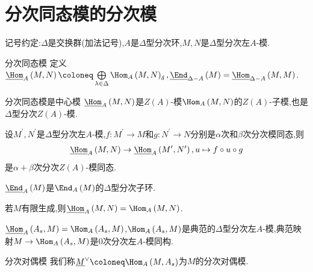 \section{分次同态模的分次模}

记号约定:$\Delta$是交换群(加法记号),$A$是$\Delta$型分次环,$M,N$是$\Delta$型分次左$A$-模.

\begin{definition}{分次同态模}{}
	定义$\underline{\Hom}_{A}\left(M,N\right)\coloneq\bigoplus\limits_{\lambda\in\Delta}\Hom_{A}\left(M,N\right)_{\delta},\underline{\End}_{\Delta-A}\left(M\right)=\underline{\Hom}_{\Delta-A}\left(M,M\right)$.
\end{definition}

\begin{proposition}{分次同态模是中心模}{}
	$\underline{\Hom}_{A}\left(M,N\right)$是$Z\left(A\right)$-模$\Hom_{A}\left(M,N\right)$的$Z\left(A\right)$-子模,也是$\Delta$型分次$Z\left(A\right)$-模.
\end{proposition}

\begin{proposition}{}{}
	设$M^{\prime},N^{\prime}$是$\Delta$型分次左$A$-模,$f:M^{\prime}\to M$和$g:N^{\prime}\to N$分别是$\alpha$次和$\beta$次分次模同态,则
	\begin{align*}
		\underline{\Hom}_{A}\left(M,N\right)\to\underline{\Hom}_{A}\left(M^{\prime},N^{\prime}\right),u\mapsto f\circ u\circ g
	\end{align*}
	是$\alpha+\beta$次分次$Z\left(A\right)$-模同态.
\end{proposition}

\begin{corollary}{}{}
	$\underline{\End}_{A}\left(M\right)$是$\End_{A}\left(M\right)$的$\Delta$型分次子环.
\end{corollary}

\begin{proposition}{}{}
	若$M$有限生成,则$\underline{\Hom}_{A}\left(M,N\right)=\Hom_{A}\left(M,N\right)$.
\end{proposition}

\begin{corollary}{}{}
	$\underline{\Hom}_{A}\left(A_{s},M\right)=\Hom_{A}\left(A_{s},M\right)$,$\Hom_{A}\left(A_{s},M\right)$是典范的$\Delta$型分次左$A$-模,典范映射$M\to\Hom_{A}\left(A_{s},M\right)$是$0$次分次左$A$-模同构.
\end{corollary}

\begin{definition}{分次对偶模}{}
	我们称$\underline{M}^{\vee}\coloneq\Hom_{A}\left(M,A_{s}\right)$为$M$的分次对偶模.
\end{definition}


